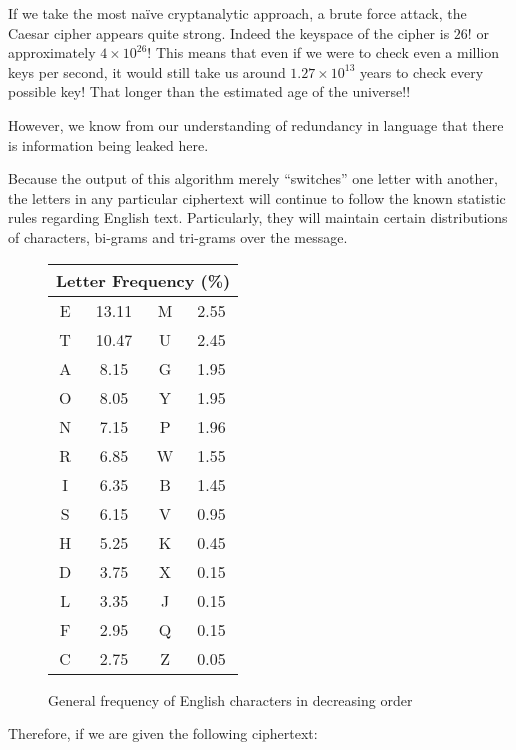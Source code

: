 \documentclass[12pt, a4paper, draft]{report}
\begin{document}
If we take the most naïve cryptanalytic approach, a brute force attack,
the Caesar cipher appears quite strong. Indeed the keyspace of the cipher
is $26!$ or approximately $4 \times 10^{26}$! This means that even if we
were to check even a million keys per second, it would still take us around
$1.27 \times 10^{13}$ years to check every possible key! That longer than
the estimated age of the universe!!

However, we know from our understanding of redundancy in language that there
is information being leaked here.

Because the output of this algorithm merely ``switches'' one letter with another,
the letters in any particular ciphertext will continue to follow the known
statistic rules regarding English text. Particularly, they will maintain certain
distributions of characters, bi-grams and tri-grams over the message.

\begin{figure}[h]
\begin{center}
\begin{tabular}{cccc}
\toprule
\multicolumn{4}{c}{Letter Frequency (\%)}\\
\midrule
E & 13.11 & M & 2.55\\
T & 10.47 & U & 2.45\\
A & 8.15  & G & 1.95\\
O & 8.05  & Y & 1.95\\
N & 7.15  & P & 1.96\\
R & 6.85  & W & 1.55\\
I & 6.35  & B & 1.45\\
S & 6.15  & V & 0.95\\
H & 5.25  & K & 0.45\\
D & 3.75  & X & 0.15\\
L & 3.35  & J & 0.15\\
F & 2.95  & Q & 0.15\\
C & 2.75  & Z & 0.05\\
\bottomrule
\end{tabular}
\end{center}
\caption{General frequency of English characters in decreasing order}
\end{figure}


\pagebreak
Therefore, if we are given the following ciphertext:

\end{document}
